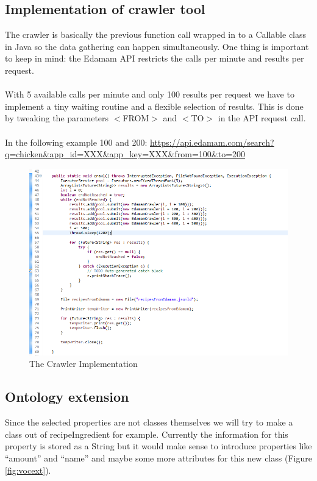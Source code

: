 \documentclass{article}
\begin{document}
\subsection{Implementation of crawler tool}
The crawler is basically the previous function call wrapped in to a Callable class in Java so the data gathering can happen simultaneously. One thing is important to keep in mind: the Edamam API restricts the calls per minute and results per request. \\ \\
With 5 available calls per minute and only 100 results per request we have to implement a tiny waiting routine and a flexible selection of results. This is done by tweaking the parameters $<$FROM$>$ and $<$TO$>$ in the API request call. \\ \\
In the following example 100 and 200: \url{https://api.edamam.com/search?q=chicken&app_id=XXX&app_key=XXX&from=100&to=200}

\begin{figure}[H]
  \centering
  \includegraphics[width=13cm]{pictures/crawler_tool.png}
  \caption{The Crawler Implementation}
  \label{fig:crawl}
\end{figure}
\newpage

\subsection{Ontology extension}
Since the selected properties are not classes themselves we will try to make a class out of recipeIngredient for example. Currently the information for this property is stored as a String but it would make sense to introduce properties like \enquote{amount} and \enquote{name} and maybe some more attributes for this new class (Figure \ref{fig:vocext}).
\end{document}
